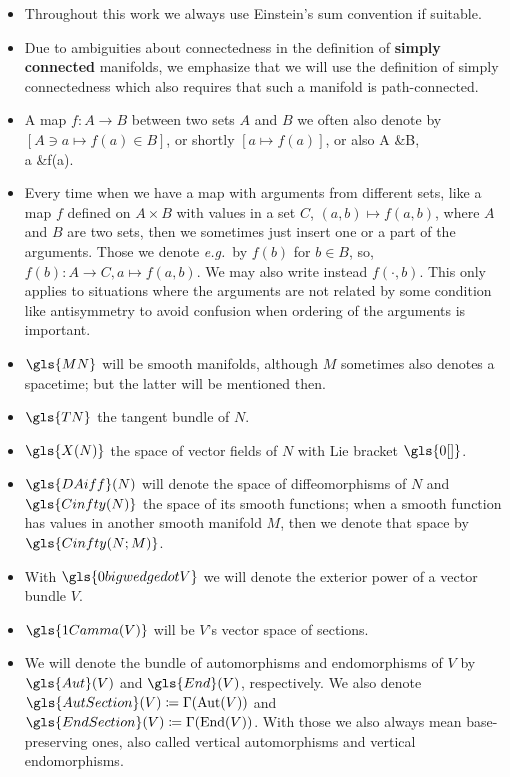 \begin{itemize}
	\item Throughout this work we always use Einstein's sum convention if suitable.
	\item Due to ambiguities about connectedness in the definition of \textbf{simply connected} manifolds, we emphasize that we will use the definition of simply connectedness which also requires that such a manifold is path-connected.
	\item A map $f: A \to B$ between two sets $A$ and $B$ we often also denote by $[A \ni a \mapsto f(a) \in B]$, or shortly $[a \mapsto f(a)]$, or also
\bas
A &\to B,\\
a &\mapsto f(a).
\eas
	\item Every time when we have a map with arguments from different sets, like a map $f$ defined on $A \times B$ with values in a set $C$, $(a,b) \mapsto f(a,b)$, where $A$ and $B$ are two sets, then we sometimes just insert one or a part of the arguments. Those we denote \textit{e.g.}~by $f(b)$ for $b \in B$, so, $f(b): A \to C, a\mapsto f(a,b)$. We may also write instead $f(\cdot, b)$. This only applies to situations where the arguments are not related by some condition like antisymmetry to avoid confusion when ordering of the arguments is important.
	\item $\gls{MN}$ will be smooth manifolds, although $M$ sometimes also denotes a spacetime; but the latter will be mentioned then.
	\item $\gls{TN}$ the tangent bundle of $N$.
	\item $\gls{X(N)}$ the space of vector fields of $N$ with Lie bracket $\gls{0[]}$.
	\item $\gls{DAiff}(N)$ will denote the space of diffeomorphisms of $N$ and $\gls{Cinfty(N)}$ the space of its smooth functions; when a smooth function has values in another smooth manifold $M$, then we denote that space by $ \gls{Cinfty(N;M)}$.
	\item With $\gls{0bigwedgedotV}$ we will denote the exterior power of a vector bundle $V$.
	\item $\gls{1Camma(V)}$ will be $V$'s vector space of sections.
	\item We will denote the bundle of automorphisms and endomorphisms of $V$ by $\gls{Aut}(V)$ and $\gls{End}(V)$, respectively. We also denote $\gls{AutSection}(V) \coloneqq \Gamma(\mathrm{Aut}(V))$ and $\gls{EndSection}(V) \coloneqq \Gamma(\mathrm{End}(V))$. With those we also always mean base-preserving ones, also called vertical automorphisms and vertical endomorphisms.

\end{itemize}
